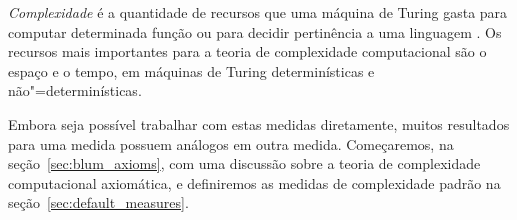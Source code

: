 \emph{Complexidade} é a quantidade de recursos
que uma máquina de Turing gasta
para computar determinada função
ou para decidir pertinência a uma linguagem
\cite[p.~285]{HopcroftUllman1979}.
Os recursos mais importantes para a teoria de complexidade computacional
são o espaço e o tempo,
em máquinas de Turing determinísticas e não"=determinísticas.

Embora seja possível trabalhar com estas medidas diretamente,
muitos resultados para uma medida
possuem análogos em outra medida.
Começaremos,
na seção~\ref{sec:blum_axioms},
com uma discussão sobre a teoria de complexidade computacional axiomática,
e definiremos as medidas de complexidade padrão na seção~\ref{sec:default_measures}.

